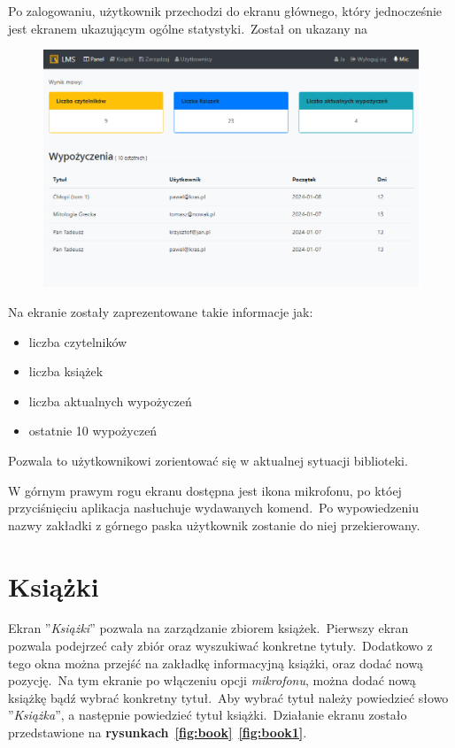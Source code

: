 Po zalogowaniu, użytkownik przechodzi do ekranu głównego, który jednocześnie jest ekranem ukazującym ogólne statystyki.\ Został on ukazany na 

\begin{figure}[H]
    \centering
    \includegraphics[width=\textwidth]{images/first}
    \label{fig:das}
\end{figure}

Na ekranie zostały zaprezentowane takie informacje jak:
\begin{itemize}
    \item liczba czytelników
    \item liczba książek
    \item liczba aktualnych wypożyczeń
    \item ostatnie 10 wypożyczeń
\end{itemize}
Pozwala to użytkownikowi zorientować się w aktualnej sytuacji biblioteki.

W górnym prawym rogu ekranu dostępna jest ikona mikrofonu, po któej przyciśnięciu aplikacja nasłuchuje wydawanych komend.\ Po wypowiedzeniu nazwy zakładki z górnego paska użytkownik zostanie do niej przekierowany.


\section{Książki}
Ekran ''\textit{Książki}'' pozwala na zarządzanie zbiorem książek.\ Pierwszy ekran pozwala podejrzeć cały zbiór oraz wyszukiwać konkretne tytuły.\ Dodatkowo z tego okna można przejść na zakładkę informacyjną książki, oraz dodać nową pozycję.\ Na tym ekranie po włączeniu opcji \textit{mikrofonu}, można dodać nową książkę bądź wybrać konkretny tytuł.\ Aby wybrać tytuł należy powiedzieć słowo ''\textit{Książka}'', a następnie powiedzieć tytuł książki.\ Działanie ekranu zostało przedstawione na \textbf{rysunkach}~\textbf{\ref{fig:book}}~\textbf{\ref{fig:book1}}.

